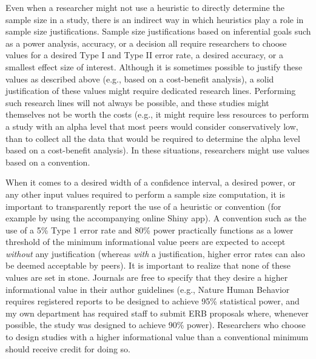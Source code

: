 \documentclass[
  oneside]{krantz}
\begin{document}
Even when a researcher might not use a heuristic to directly determine the sample size in a study, there is an indirect way in which heuristics play a role in sample size justifications. Sample size justifications based on inferential goals such as a power analysis, accuracy, or a decision all require researchers to choose values for a desired Type I and Type II error rate, a desired accuracy, or a smallest effect size of interest. Although it is sometimes possible to justify these values as described above (e.g., based on a cost-benefit analysis), a solid justification of these values might require dedicated research lines. Performing such research lines will not always be possible, and these studies might themselves not be worth the costs (e.g., it might require less resources to perform a study with an alpha level that most peers would consider conservatively low, than to collect all the data that would be required to determine the alpha level based on a cost-benefit analysis). In these situations, researchers might use values based on a convention.

When it comes to a desired width of a confidence interval, a desired power, or any other input values required to perform a sample size computation, it is important to transparently report the use of a heuristic or convention (for example by using the accompanying online Shiny app). A convention such as the use of a 5\% Type 1 error rate and 80\% power practically functions as a lower threshold of the minimum informational value peers are expected to accept \emph{without} any justification (whereas \emph{with} a justification, higher error rates can also be deemed acceptable by peers). It is important to realize that none of these values are set in stone. Journals are free to specify that they desire a higher informational value in their author guidelines (e.g., Nature Human Behavior requires registered reports to be designed to achieve 95\% statistical power, and my own department has required staff to submit ERB proposals where, whenever possible, the study was designed to achieve 90\% power). Researchers who choose to design studies with a higher informational value than a conventional minimum should receive credit for doing so.
\end{document}
